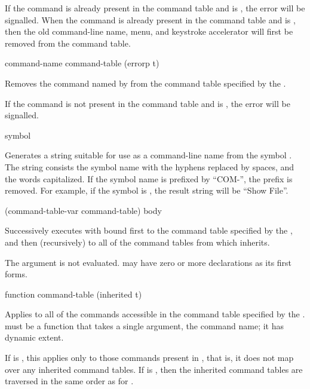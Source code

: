 If the command is already present in the command table and  is
, the  error will be signalled.  When the
command is already present in the command table and  is
, then the old command-line name, menu, and keystroke accelerator
will first be removed from the command table.


 {command-name command-table \key (errorp t)}

Removes the command named by  from the command table specified
by the  .

If the command is not present in the command table and  is
, the  error will be signalled.

 {symbol}

Generates a string suitable for use as a command-line name from the symbol
.  The string consists the symbol name with the hyphens replaced by
spaces, and the words capitalized.  If the symbol name is prefixed by ``COM-'',
the prefix is removed.  For example, if the symbol is , the
result string will be ``Show File''.


  {(command-table-var command-table) \body body}

Successively executes  with  bound first to
the command table specified by the 
, and then (recursively) to all of the command tables from
which  inherits.

The  argument is not evaluated.   may have zero
or more declarations as its first forms. 

 {function command-table \key (inherited t)}

Applies  to all of the commands accessible in the command table
specified by the  .
 must be a function that takes a single argument, the command
name; it has dynamic extent.

If  is , this applies  only to
those commands present in , that is, it does not map over
any inherited command tables.  If  is , then the
inherited command tables are traversed in the same order as for
.

